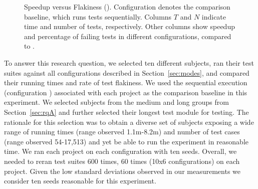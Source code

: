 \begin{figure}[t]
\begin{tabular}{l|rr|rr|rr|rr|rr|rr}

\bottomrule%
\end{tabular}
\caption{Speedup versus Flakiness (\subcolB). Configuration
  \emph{\Seq{}} denotes the comparison baseline, which runs tests
  sequentially.  Columns $T$ and $N$ indicate time and number of
  tests, respectively.  Other columns show speedup and percentage of
  failing tests in different configurations, compared to
  \emph{\Seq{}}.}
\label{tab:rq6-table}
\end{figure}


To answer this research question, we selected ten different subjects,
ran their test suites against all configurations described in
Section~\ref{sec:modes}, and compared their running times and rate of
test flakiness.  We used the sequential execution (configuration
\emph{\Seq{}}) associated with each project as the comparison baseline
in this experiment.  We selected subjects from the medium and long
groups from Section~\ref{sec:rqA} and further selected their longest
test module for testing.  The rationale for this selection was to
obtain a diverse set of subjects exposing a wide range of running
times (range observed 1.1m-8.2m) and number of test cases (range
observed 54-17,513) and yet be able to run the experiment in
reasonable time.  We ran each project on each configuration with ten
seeds.  Overall, we needed to reran test suites 600 times, 60 times
(10x6 configurations) on each project.  Given the low standard
deviations observed in our measurements we consider ten seeds
reasonable for this experiment.



